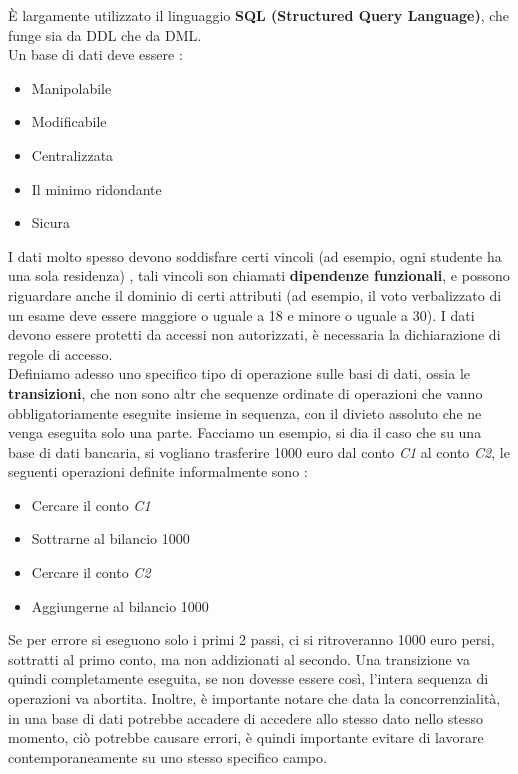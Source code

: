 \documentclass[12pt, letterpaper]{article}
\begin{document}
È largamente utilizzato il linguaggio \textbf{SQL (Structured Query Language)}, che funge sia da DDL che da DML.
\\Un base di dati deve essere :
\begin{itemize}
    \item Manipolabile
    \item Modificabile
    \item Centralizzata
    \item Il minimo ridondante
    \item Sicura
\end{itemize}
 I dati molto spesso devono soddisfare certi vincoli (ad esempio, ogni studente ha una sola residenza)
 , tali vincoli son chiamati \textbf{dipendenze funzionali}, e possono riguardare anche il dominio di certi
 attributi (ad esempio, il voto verbalizzato di un esame deve essere maggiore o uguale a 18 e minore o uguale a 30).
 I dati devono essere protetti da accessi non autorizzati, è necessaria la dichiarazione di regole di accesso.
\\Definiamo adesso uno specifico tipo di operazione sulle basi di dati, ossia le \textbf{transizioni}, che non sono altr
che sequenze ordinate di operazioni che vanno obbligatoriamente eseguite insieme in sequenza, con il divieto
assoluto che ne venga eseguita solo una parte.
Facciamo un esempio, si dia il caso che su una base di dati bancaria, si vogliano trasferire 1000 euro dal conto \textit{C1} 
al conto \textit{C2}, le seguenti operazioni definite informalmente sono :
\begin{itemize}
    \item Cercare il conto \textit{C1}
    \item Sottrarne al bilancio 1000
    \item Cercare il conto \textit{C2}
    \item Aggiungerne al bilancio 1000
\end{itemize} 
Se per errore si eseguono solo i primi 2 passi, ci si ritroveranno 1000 euro persi, sottratti al primo conto, ma non
addizionati al secondo. Una transizione va quindi completamente eseguita, se non dovesse essere così, l'intera sequenza
di operazioni va abortita. Inoltre, è importante notare che data la concorrenzialità, in una base di dati potrebbe
accadere di accedere allo stesso dato nello stesso momento, ciò potrebbe causare errori, è quindi importante evitare
di lavorare contemporaneamente su uno stesso specifico campo.
\end{document}
